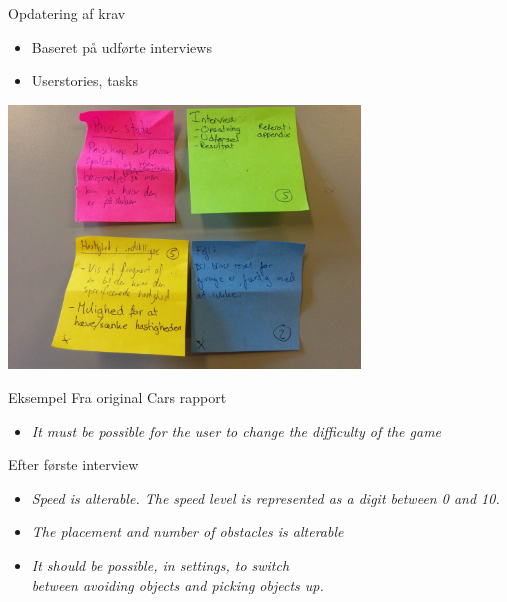 \begin{frame}{Opdatering af krav}
\begin{itemize}
\item Baseret på udførte interviews
\item Userstories, tasks
\end{itemize}

\begin{center}
\includegraphics[width = 0.7\textwidth]{pgraphics/tasks}
\end{center}
\end{frame}

\begin{frame}{Eksempel}
Fra original Cars rapport
\begin{itemize}
\item \textit{It must be possible for the user to change the difficulty of the game}
\end{itemize}

Efter første interview
\begin{itemize}
\item \textit{Speed is alterable. The speed level is represented as a digit between 0 and 10.}
\item \textit{The placement and number of obstacles is alterable}
\item\textit{ It should be possible, in settings, to switch\\ between avoiding objects and picking objects up.}
\end{itemize}
\end{frame}
